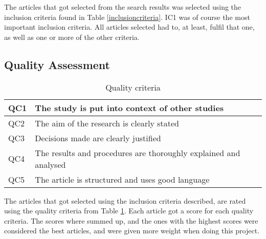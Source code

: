 The articles that got selected from the search results was selected using the inclusion criteria found in Table \ref{inclusioncriteria}. IC1 was of course the most important inclusion criteria. All articles selected had to, at least, fulfil that one, as well as one or more of the other criteria.


\subsection{Quality Assessment}

\begin{table}
\centering
\begin{tabular}{|l|l|} \hline
QC1 & The study is put into context of other studies\\ \hline
QC2 & The aim of the research is clearly stated\\ \hline
QC3 & Decisions made are clearly justified\\ \hline
QC4 & The results and procedures are thoroughly explained and analysed \\ \hline
QC5 & The article is structured and uses good language \\ \hline
\end{tabular}
\caption{Quality criteria}
\label{qualitycriteria}
\end{table}

The articles that got selected using the inclusion criteria described, are rated using the quality criteria from Table \ref{qualitycriteria}. Each article got a score for each quality criteria. The scores where summed up, and the ones with the highest scores were considered the best articles, and were given more weight when doing this project.




